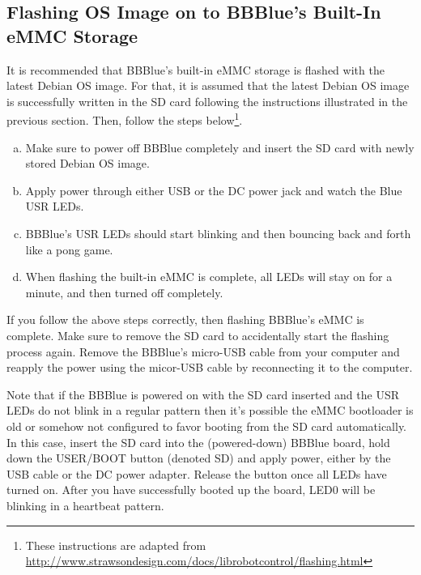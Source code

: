 \subsection{Flashing OS Image on to BBBlue's Built-In eMMC Storage}
It is recommended that BBBlue's built-in eMMC storage is flashed with the latest Debian OS image. For that, it is assumed that the latest Debian OS image is successfully written in the SD card following the instructions illustrated in the previous section. Then, follow the steps below\footnote{These instructions are adapted from \url{http://www.strawsondesign.com/docs/librobotcontrol/flashing.html}}.  

\begin{mdframed}[backgroundcolor=yellow!5, roundcorner=7pt,outerlinecolor= blue!70!black,outerlinewidth=1.2]
\begin{enumerate}[(a)]
    \item Make sure to power off BBBlue completely and insert the SD card with newly stored Debian OS image.
    \item Apply power through either USB or the DC power jack and watch the Blue USR LEDs. 
    \item BBBlue's USR LEDs should start blinking and then bouncing back and forth like a pong game. 
    \item When flashing the built-in eMMC is complete, all LEDs will stay on for a minute, and then turned off completely. 

\end{enumerate}
%
If you follow the above steps correctly, then flashing BBBlue's eMMC is complete. Make sure to remove the SD card to accidentally start the flashing process again.  Remove the BBBlue's micro-USB cable from your computer and reapply the power using the micor-USB cable by reconnecting it to the computer.


 Note that if the BBBlue is powered on with the SD card inserted and the USR LEDs do not blink in a regular pattern then it's possible the eMMC bootloader is old or somehow not configured to favor booting from the SD card automatically. In this case, insert the SD card into the (powered-down) BBBlue board, hold down the USER/BOOT button (denoted SD) and apply power, either by the USB cable or the DC power adapter. Release the button once all LEDs have turned on. After you have successfully booted up the board, LED0 will be blinking in a heartbeat pattern.
\end{mdframed}


